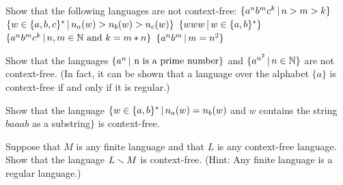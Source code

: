 \begin{exercises}

\problem Show that the following languages are not context-free:
\ppart $\{a^nb^mc^k\,|\, n>m>k\}$
\ppart $\{w\in\{a,b,c\}^*\,|\, n_a(w)>n_b(w)>n_c(w)\}$
\ppart $\{www\,|\, w\in\{a,b\}^*\}$
\ppart $\{a^nb^mc^k\,|\, n,m\in{\mathbb N}\text{ and } k=m*n\}$
\ppart $\{a^nb^m\,|\, m=n^2\}$

\problem Show that the languages $\{a^n\,|\, \,\text{n is a prime number}\}$
and $\{a^{n^2}\,|\, n\in {\mathbb N}\}$ are not context-free.  (In fact, it 
can be shown that a language over the alphabet $\{a\}$ is
context-free if and only if it is regular.)

\problem Show that the language $\{w\in\{a,b\}^*\,|\, n_a(w)=n_b(w)$
and $w$ contains the string $baaab$ as a substring$\}$ is context-free.

\problem Suppose that $M$ is any finite language and that
$L$ is any context-free language.  Show that the language
$L\smallsetminus M$ is context-free.  (Hint: Any finite language is a
regular language.)

\end{exercises}




